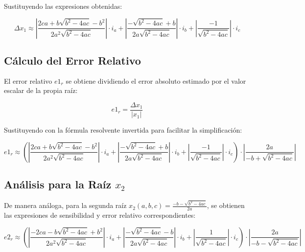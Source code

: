 Sustituyendo las expresiones obtenidas:

$$\Delta x_1 \approx \left| \frac{2ca+b\sqrt{b^2-4ac}-b^2}{2a^2\sqrt{b^2-4ac}} \right| \cdot i_a + \left| \frac{-\sqrt{b^2-4ac}+b}{2a\sqrt{b^2-4ac}} \right| \cdot i_b + \left| \frac{-1}{\sqrt{b^2-4ac}} \right| \cdot i_c$$

\subsection{Cálculo del Error Relativo}

El error relativo $e1_r$ se obtiene dividiendo el error absoluto estimado por el valor escalar de la propia raíz:

$$e1_r = \frac{\Delta x_1}{|x_1|}$$

Sustituyendo con la fórmula resolvente invertida para facilitar la simplificación:

$$e1_r \approx \left( \left| \frac{2ca+b\sqrt{b^2-4ac}-b^2}{2a^2\sqrt{b^2-4ac}} \right| \cdot i_a + \left| \frac{-\sqrt{b^2-4ac}+b}{2a\sqrt{b^2-4ac}} \right| \cdot i_b + \left| \frac{-1}{\sqrt{b^2-4ac}} \right| \cdot i_c \right) \cdot \left| \frac{2a}{-b + \sqrt{b^2 - 4ac}} \right|$$

\subsection{Análisis para la Raíz $x_2$}

De manera análoga, para la segunda raíz $x_2(a, b, c) = \frac{-b - \sqrt{b^2 - 4ac}}{2a}$, se obtienen las expresiones de sensibilidad y error relativo correspondientes:

$$e2_r \approx \left( \left| \frac{-2ca-b\sqrt{b^2-4ac}+b^2}{2a^2\sqrt{b^2-4ac}} \right| \cdot i_a + \left| \frac{-\sqrt{b^2-4ac}-b}{2a\sqrt{b^2-4ac}} \right| \cdot i_b + \left| \frac{1}{\sqrt{b^2-4ac}} \right| \cdot i_c \right) \cdot \left| \frac{2a}{-b - \sqrt{b^2 - 4ac}} \right|$$

